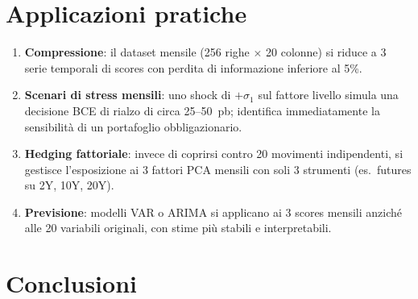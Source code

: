\documentclass[11pt,a4paper]{article}
\theoremstyle{plain}
\theoremstyle{definition}
\theoremstyle{remark}
\begin{document}
\newpage
\section{Applicazioni pratiche}

\begin{enumerate}
  \item \textbf{Compressione}: il dataset mensile (256 righe $\times$ 20 colonne)
        si riduce a 3 serie temporali di scores con perdita di informazione
        inferiore al 5\%.
  \item \textbf{Scenari di stress mensili}: uno shock di $+\sigma_1$ sul fattore
        livello simula una decisione BCE di rialzo di circa 25--50~pb; identifica
        immediatamente la sensibilità di un portafoglio obbligazionario.
  \item \textbf{Hedging fattoriale}: invece di coprirsi contro 20 movimenti
        indipendenti, si gestisce l'esposizione ai 3 fattori PCA mensili con
        soli 3 strumenti (es.\ futures su 2Y, 10Y, 20Y).
  \item \textbf{Previsione}: modelli VAR o ARIMA si applicano ai 3 scores mensili
        anziché alle 20 variabili originali, con stime più stabili e
        interpretabili.
\end{enumerate}

\section{Conclusioni}
\end{document}
